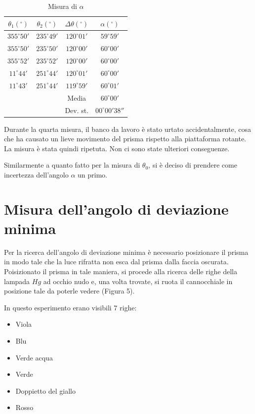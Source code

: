 \documentclass{article}
\begin{document}
\begin{table}[h!]
\centering
\begin{tabular}{ | c | c | c | c | }
  \hline
  $\theta _1 (^{\circ})$ & $\theta _2 (^{\circ})$ & $\Delta \theta (^{\circ})$ & $\alpha (^{\circ})$ \\
  \hline
  $355^{\circ} 50'$ & $235^{\circ} 49'$ & $120^{\circ} 01'$ & $59^{\circ} 59'$ \\
  $355^{\circ} 50'$ & $235^{\circ} 50'$ & $120^{\circ} 00'$ & $60^{\circ} 00'$ \\
  $355^{\circ} 52'$ & $235^{\circ} 52'$ & $120^{\circ} 00'$ & $60^{\circ} 00'$ \\
  $11^{\circ} 44'$ & $251^{\circ} 44'$ & $120^{\circ} 01'$ & $60^{\circ} 00'$ \\
  $11^{\circ} 43'$ & $251^{\circ} 44'$ & $119^{\circ} 59'$ & $60^{\circ} 01'$ \\
  \hline
  && Media & $60^{\circ} 00'$ \\
  && Dev. st. & $00^{\circ} 00' 38''$ \\
  \hline
\end{tabular}
  \caption{Misura di $\alpha$}
  \label{table:1}
\end{table}

Durante la quarta misura, il banco da lavoro è stato urtato accidentalmente, cosa che ha causato un lieve movimento del prisma rispetto alla piattaforma rotante. La misura è stata quindi ripetuta. Non ci sono state ulteriori conseguenze.

Similarmente a quanto fatto per la misura di $\theta _0$, si è deciso di prendere come incertezza dell'angolo $\alpha$ un primo.

\clearpage

\section{Misura dell'angolo di deviazione minima}

Per la ricerca dell'angolo di deviazione minima è necessario posizionare il prisma in modo tale che la luce rifratta non esca dal prisma dalla faccia oscurata. Poisizionato il prisma in tale maniera, si procede alla ricerca delle righe della lampada $Hg$ ad occhio nudo e, una volta trovate, si ruota il cannocchiale in posizione tale da poterle vedere (Figura 5).

In questo esperimento erano visibili 7 righe:

\begin{itemize}
  \item Viola
  \item Blu
  \item Verde acqua
  \item Verde
  \item Doppietto del giallo
  \item Rosso
\end{itemize}
\end{document}
